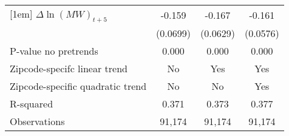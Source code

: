 {\begin{tabular}{l*{3}{c}}
[1em]
$\Delta \ln(MW)_{t+5}$&   -0.159\sym{**} &   -0.167\sym{**} &   -0.161\sym{***}\\
          & (0.0699)         & (0.0629)         & (0.0576)         \\
\hline
P-value no pretrends&    0.000         &    0.000         &    0.000         \\
Zipcode-specifc linear trend&       No         &      Yes         &      Yes         \\
Zipcode-specific quadratic trend&       No         &       No         &      Yes         \\
R-squared &    0.371         &    0.373         &    0.377         \\
Observations&   91,174         &   91,174         &   91,174         \\
\hline\hline
\end{tabular}
}
